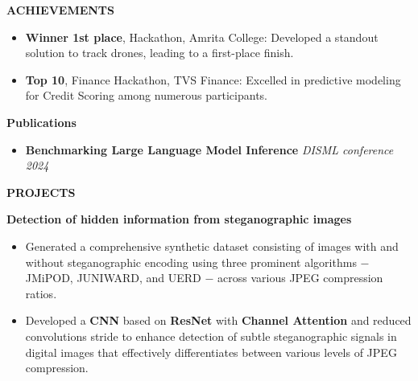 \documentclass[10pt,a4]{article}
\begin{document}
{\begin{flushleft}
\end{flushleft}


\begin{flushleft}
        {\Large \textbf{ACHIEVEMENTS}}
        \vspace{1.5mm}
            \begin{itemize}
            \item \textbf{Winner 1st place}, Hackathon, Amrita College: Developed a standout solution to track drones, leading to a first-place finish.
            \item \textbf{Top 10}, Finance Hackathon, TVS Finance: Excelled in predictive modeling for Credit Scoring among numerous participants.
            \end{itemize}
        
        \vspace{1mm}
        {\large \textbf{Publications}} \\
        \vspace{0.5mm}
        \begin{itemize}
            \item \textbf{Benchmarking Large Language Model Inference} \hfill \textit{DISML conference 2024}
        \end{itemize}
\end{flushleft}

\begin{flushleft}
    {\Large \textbf{PROJECTS}}
    \vspace{1mm}
    \item \textbf{\large Detection of hidden information from steganographic images}
        \vspace{0.5mm}
        \begin{itemize}
            \item Generated a comprehensive synthetic dataset consisting of images with and without steganographic encoding using three prominent algorithms $-$ JMiPOD, JUNIWARD, and UERD $-$ across various JPEG compression ratios.
            \item Developed a \textbf{CNN} based on \textbf{ResNet} with \textbf{Channel Attention} and reduced convolutions stride to enhance detection of subtle steganographic signals in digital images that effectively differentiates between various levels of JPEG compression.
            

\end{itemize}
\end{flushleft}}
\end{document}

